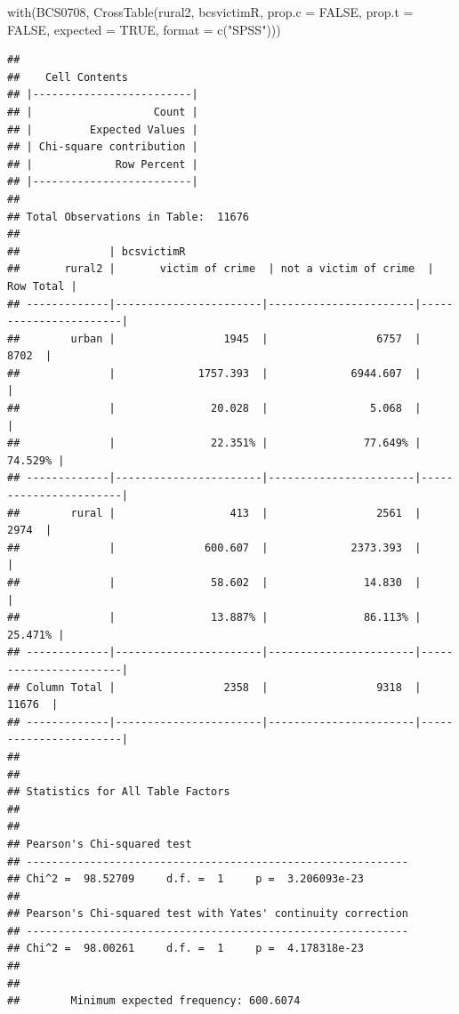\documentclass[
]{book}
\newenvironment{Shaded}{\begin{snugshade}}{\end{snugshade}}
\newcommand{\AttributeTok}[1]{\textcolor[rgb]{0.77,0.63,0.00}{#1}}
\newcommand{\ConstantTok}[1]{\textcolor[rgb]{0.00,0.00,0.00}{#1}}
\newcommand{\FunctionTok}[1]{\textcolor[rgb]{0.00,0.00,0.00}{#1}}
\newcommand{\NormalTok}[1]{#1}
\newcommand{\StringTok}[1]{\textcolor[rgb]{0.31,0.60,0.02}{#1}}
\begin{document}
\begin{Shaded}
\begin{Highlighting}[]
\FunctionTok{with}\NormalTok{(BCS0708, }\FunctionTok{CrossTable}\NormalTok{(rural2, bcsvictimR, }\AttributeTok{prop.c =} \ConstantTok{FALSE}\NormalTok{, }\AttributeTok{prop.t =} \ConstantTok{FALSE}\NormalTok{, }\AttributeTok{expected =} \ConstantTok{TRUE}\NormalTok{, }\AttributeTok{format =} \FunctionTok{c}\NormalTok{(}\StringTok{"SPSS"}\NormalTok{)))}
\end{Highlighting}
\end{Shaded}

\begin{verbatim}
## 
##    Cell Contents
## |-------------------------|
## |                   Count |
## |         Expected Values |
## | Chi-square contribution |
## |             Row Percent |
## |-------------------------|
## 
## Total Observations in Table:  11676 
## 
##              | bcsvictimR 
##       rural2 |       victim of crime  | not a victim of crime  |             Row Total | 
## -------------|-----------------------|-----------------------|-----------------------|
##        urban |                 1945  |                 6757  |                 8702  | 
##              |             1757.393  |             6944.607  |                       | 
##              |               20.028  |                5.068  |                       | 
##              |               22.351% |               77.649% |               74.529% | 
## -------------|-----------------------|-----------------------|-----------------------|
##        rural |                  413  |                 2561  |                 2974  | 
##              |              600.607  |             2373.393  |                       | 
##              |               58.602  |               14.830  |                       | 
##              |               13.887% |               86.113% |               25.471% | 
## -------------|-----------------------|-----------------------|-----------------------|
## Column Total |                 2358  |                 9318  |                11676  | 
## -------------|-----------------------|-----------------------|-----------------------|
## 
##  
## Statistics for All Table Factors
## 
## 
## Pearson's Chi-squared test 
## ------------------------------------------------------------
## Chi^2 =  98.52709     d.f. =  1     p =  3.206093e-23 
## 
## Pearson's Chi-squared test with Yates' continuity correction 
## ------------------------------------------------------------
## Chi^2 =  98.00261     d.f. =  1     p =  4.178318e-23 
## 
##  
##        Minimum expected frequency: 600.6074
\end{verbatim}
\end{document}
